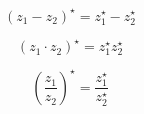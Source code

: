 \documentclass{article}
\begin{document}
\begin{equation}
    (z_1 - z_2)^\star = z_1^\star - z_2^\star
    \label{eq:Complex conjugation over subtraction}
\end{equation}

\begin{equation}
    (z_1 \cdot z_2)^\star = z_1^\star z_2^\star
    \label{eq:Complex conjugation over multiplication}
\end{equation}

\begin{equation}
    (\frac{z_1}{z_2})^\star = \frac{z_1^\star}{z_2^\star}
    \label{eq:Complex conjugation over division}
\end{equation}
\end{document}
